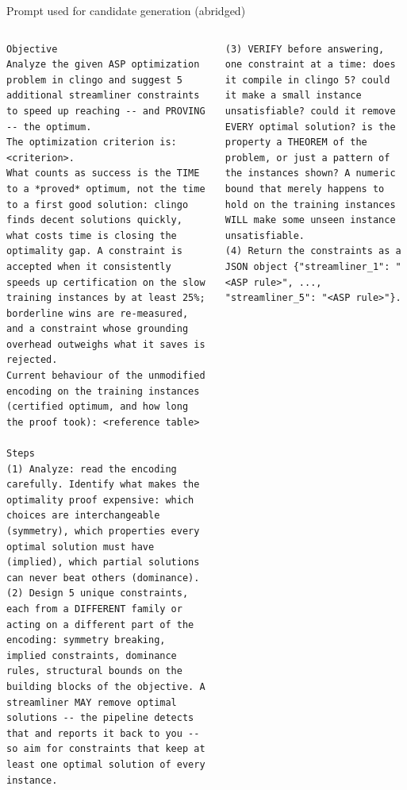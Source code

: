 \documentclass[10pt,aspectratio=169]{beamer}
\begin{document}
\begin{frame}[fragile]{Prompt used for candidate generation (abridged)}
\begin{columns}[T,onlytextwidth]
\begin{lstlisting}[basicstyle=\ttfamily\fontsize{5.3}{6.1}\selectfont,deletecomment={[l]\%},breakatwhitespace=true,breakindent=0pt,breakautoindent=false,aboveskip=0pt]
Objective
Analyze the given ASP optimization problem in clingo and suggest 5 additional streamliner constraints to speed up reaching -- and PROVING -- the optimum.
The optimization criterion is: <criterion>.
What counts as success is the TIME to a *proved* optimum, not the time to a first good solution: clingo finds decent solutions quickly, what costs time is closing the optimality gap. A constraint is accepted when it consistently speeds up certification on the slow training instances by at least 25%; borderline wins are re-measured, and a constraint whose grounding overhead outweighs what it saves is rejected.
Current behaviour of the unmodified encoding on the training instances (certified optimum, and how long the proof took): <reference table>

Steps
(1) Analyze: read the encoding carefully. Identify what makes the optimality proof expensive: which choices are interchangeable (symmetry), which properties every optimal solution must have (implied), which partial solutions can never beat others (dominance).
(2) Design 5 unique constraints, each from a DIFFERENT family or acting on a different part of the encoding: symmetry breaking, implied constraints, dominance rules, structural bounds on the building blocks of the objective. A streamliner MAY remove optimal solutions -- the pipeline detects that and reports it back to you -- so aim for constraints that keep at least one optimal solution of every instance.
\end{lstlisting}
\begin{lstlisting}[basicstyle=\ttfamily\fontsize{5.3}{6.1}\selectfont,deletecomment={[l]\%},breakatwhitespace=true,breakindent=0pt,breakautoindent=false,aboveskip=0pt]
(3) VERIFY before answering, one constraint at a time: does it compile in clingo 5? could it make a small instance unsatisfiable? could it remove EVERY optimal solution? is the property a THEOREM of the problem, or just a pattern of the instances shown? A numeric bound that merely happens to hold on the training instances WILL make some unseen instance unsatisfiable.
(4) Return the constraints as a JSON object {"streamliner_1": "<ASP rule>", ..., "streamliner_5": "<ASP rule>"}.


\end{lstlisting}
\end{columns}
\end{frame}
\end{document}
